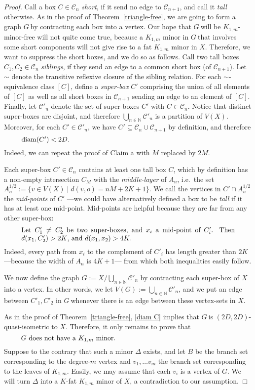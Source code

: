 \documentclass[a4paper]{article}
\newcommand{\defi}[1]{{\color{darkgray}\emph{#1}}}
\newcommand{\N}{\ensuremath{\mathbb N}}
\newcommand{\cc}{\ensuremath{\mathcal C}}
\newcommand{\nin}{\ensuremath{{n\in\N}}}
\newcommand{\g}{\ensuremath{G\ }}
\newcommand{\G}{\ensuremath{G}}
\newcommand{\Tr}[1]{Theorem~\ref{#1}}
\newcommand{\labtequ}[2]{\begin{equation} \label{#1} 	\begin{minipage}[c]{0.9\textwidth}  #2 \end{minipage} \ignorespacesafterend \end{equation} }
\newcommand{\diam}{\mathrm{diam}}
\begin{document}
\begin{proof}
Call a box $C\in \cc_n$ \defi{short}, if it send no edge to $\cc_{n+1}$, and call it \defi{tall} otherwise. As in the proof of \Tr{triangle-free}, we are going to form a graph \g by contracting each box into a vertex. Our hope that \g will be $K_{1,m}$-minor-free will not quite come true, because a $K_{1,m}$ minor in \g that involves some short components will not give rise to a fat $K_{1,m}$ minor in $X$. Therefore,  we want to suppress the short boxes, and we do so as follows. Call two tall boxes $C_1,C_2 \in \cc_n$ \defi{siblings}, if they send an edge to a common short box (of $\cc_{n+1}$). Let $\sim$ denote the transitive reflexive closure of the sibling relation. For each $\sim$-equivalence class $[C]$, define a \defi{super-box} $C'$ comprising the union of all elements of $[C]$ as well as all short boxes in $\cc_{n+1}$ sending an edge to an element of $[C]$. Finally, let $\cc'_n$ denote the set of super-boxes $C'$ with $C\in \cc_n$. Notice that distinct super-boxes are disjoint, and therefore $\bigcup_{\nin} \cc'_n$ is a partition of $V(X)$. Moreover, for each $C' \in \cc'_n$, we have $C' \subseteq \cc_n \cup \cc_{n+1}$ by definition, and therefore 
\labtequ{diam C}{$\diam(C') < 2D.$}
Indeed, we can repeat the proof of Claim a with $M$ replaced by $2M$. 

Each super-box $C'\in \cc_n$ contains at least one tall box $C$, which by definition has a non-empty intersection $C_M$ with the \defi{middle-layer} of $A_n$, i.e.\ the set 
$A^{1/2}_n:= \{ v\in V(X) \mid d(v,o)=nM + 2K+1 \}$. We call the vertices in $C' \cap A^{1/2}_n$ the \defi{mid-points} of $C'$ ---we could have alternatively defined a box to be \defi{tall} if it has at least one mid-point. Mid-points are helpful because they are far from any other super-box:
\labtequ{midp}{Let $C'_1\neq C'_2$ be two super-boxes, and $x_i$ a mid-point of $C'_i$. Then $d(x_1,C'_2)>2K$, and  $d(x_1,x_2)>4K$.}
Indeed,  every path from $x_i$ to the complement of $C'_i$ has length greater than $2K$ ---because the width of $A_n$ is $4K+1$--- from which both inequalities easily follow. 

\medskip
We now define the graph $G:= X/ \bigcup_\nin \cc'_n$ by contracting each super-box of $X$ into a vertex. In other words, we let $V(G):= \bigcup_\nin \cc'_n$, and we put an edge between $C'_1,C'_2$ in \g whenever there is an edge between these vertex-sets in $X$. 

As in the proof of \Tr{triangle-free}, \eqref{diam C} implies that \g is $(2D,2D)$-quasi-isometric to $X$. Therefore, it only remains to prove that
\labtequ{nominor}{\g does not have a $K_{1,m}$ minor.}
Suppose to the contrary that such a minor $\Delta$ exists, and let $B$ be the branch set corresponding to the degree-$m$ vertex and $v_1,\ldots v_m$ the branch set corresponding to the leaves of $K_{1,m}$. Easily, we may assume that each $v_i$ is a vertex of \G. We will turn $\Delta$ into a $K$-fat $K_{1,m}$ minor of $X$, a contradiction to our assumption.


\end{proof}
\end{document}
